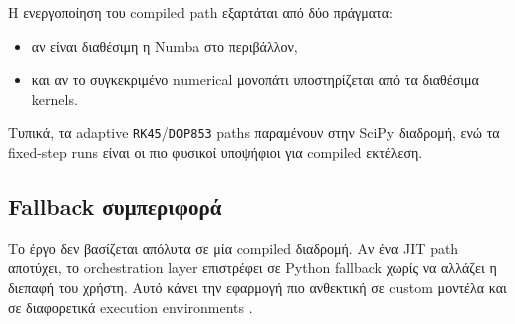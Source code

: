 Η ενεργοποίηση του compiled path εξαρτάται από δύο πράγματα:
\begin{itemize}
\item αν είναι διαθέσιμη η Numba στο περιβάλλον,
\item και αν το συγκεκριμένο numerical μονοπάτι υποστηρίζεται από τα
διαθέσιμα kernels.
\end{itemize}

Τυπικά, τα adaptive \texttt{RK45}/\texttt{DOP853} paths παραμένουν στην SciPy
διαδρομή, ενώ τα fixed-step runs είναι οι πιο φυσικοί υποψήφιοι για compiled
εκτέλεση.

\subsection{Fallback συμπεριφορά}

Το έργο δεν βασίζεται απόλυτα σε μία compiled διαδρομή. Αν ένα JIT path
αποτύχει, το orchestration layer επιστρέφει σε Python fallback χωρίς να αλλάζει
η διεπαφή του χρήστη. Αυτό κάνει την εφαρμογή πιο ανθεκτική σε custom μοντέλα
και σε διαφορετικά execution environments
\cite{nlds_src_app_cache,nlds_src_logic_lyapunov_cached,nlds_src_logic_lyapunov_sweep}.
